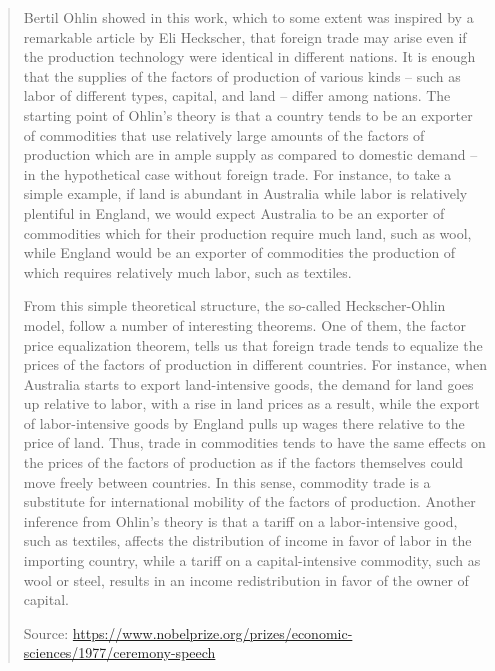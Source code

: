 {{\begin{quotation}
			Bertil Ohlin showed in this work, which to some extent was inspired by a remarkable article by Eli Heckscher, that foreign trade may arise even if the production technology were identical in different nations. It is enough that the supplies of the factors of production of various kinds – such as labor of different types, capital, and land – differ among nations. The starting point of Ohlin’s theory is that a country tends to be an exporter of commodities that use relatively large amounts of the factors of production which are in ample supply as compared to domestic demand – in the hypothetical case without foreign trade. For instance, to take a simple example, if land is abundant in Australia while labor is relatively plentiful in England, we would expect Australia to be an exporter of commodities which for their production require much land, such as wool, while England would be an exporter of commodities the production of which requires relatively much labor, such as textiles.
			
			From this simple theoretical structure, the so-called Heckscher-Ohlin model, follow a number of interesting theorems. One of them, the factor price equalization theorem, tells us that foreign trade tends to equalize the prices of the factors of production in different countries. For instance, when Australia starts to export land-intensive goods, the demand for land goes up relative to labor, with a rise in land prices as a result, while the export of labor-intensive goods by England pulls up wages there relative to the price of land. Thus, trade in commodities tends to have the same effects on the prices of the factors of production as if the factors themselves could move freely between countries. In this sense, commodity trade is a substitute for international mobility of the factors of production. Another inference from Ohlin’s theory is that a tariff on a labor-intensive good, such as textiles, affects the distribution of income in favor of labor in the importing country, while a tariff on a capital-intensive commodity, such as wool or steel, results in an income redistribution in favor of the owner of capital.
			
			Source: \url{https://www.nobelprize.org/prizes/economic-sciences/1977/ceremony-speech}
		\end{quotation}
	}
	
}

